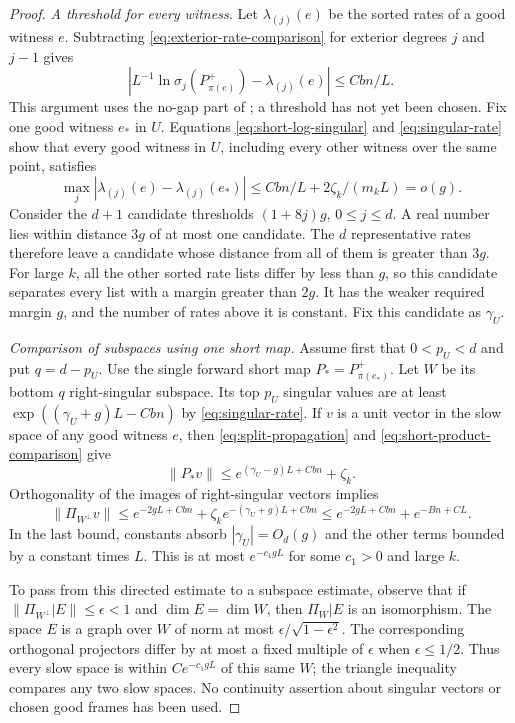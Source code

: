 \begin{proof}
\emph{A threshold for every witness.}
Let $\lambda_{(j)}(e)$ be the sorted rates of a good witness $e$.
Subtracting \eqref{eq:exterior-rate-comparison} for exterior degrees
$j$ and $j-1$ gives
\begin{equation}\label{eq:singular-rate}
 \left|L^{-1}\ln\sigma_j(P_{\pi(e)}^+)
                     -\lambda_{(j)}(e)\right|
       \leq Cbn/L.
\end{equation}
This argument uses the no-gap part of
; a threshold has not yet been chosen.
Fix one good witness $e_*$ in $U$.
Equations \eqref{eq:short-log-singular} and \eqref{eq:singular-rate}
show that every good witness in $U$, including every other witness
over the same point, satisfies
\[
 \max_j|\lambda_{(j)}(e)-\lambda_{(j)}(e_*)|
 \leq Cbn/L+2\zeta_k/(m_kL)=o(g).
\]
Consider the $d+1$ candidate thresholds $(1+8j)g$, $0\leq j\leq d$.
A real number lies within distance $3g$ of at most one candidate.
The $d$ representative rates therefore leave a candidate whose
distance from all of them is greater than $3g$.
For large $k$, all the other sorted rate lists differ by less than
$g$, so this candidate separates every list with a margin greater
than $2g$.  It has the weaker required margin $g$, and the number of
rates above it is constant.  Fix this candidate as $\gamma_U$.

\emph{Comparison of subspaces using one short map.}
Assume first that $0<p_U<d$ and put $q=d-p_U$.
Use the single forward short map $P_*=P_{\pi(e_*)}^+$.
Let $W$ be its bottom $q$ right-singular subspace.
Its top $p_U$ singular values are at least
$\exp((\gamma_U+g)L-Cbn)$ by \eqref{eq:singular-rate}.
If $v$ is a unit vector in the slow space of any good witness $e$,
then \eqref{eq:split-propagation} and
\eqref{eq:short-product-comparison} give
\[
 \|P_*v\|\leq e^{(\gamma_U-g)L+Cbn}+\zeta_k.
\]
Orthogonality of the images of right-singular vectors implies
\[
 \|\Pi_{W^\perp}v\|
 \leq e^{-2gL+Cbn}
       +\zeta_k e^{-(\gamma_U+g)L+Cbn}
 \leq e^{-2gL+Cbn}+e^{-Bn+CL}.
\]
In the last bound, constants absorb
$|\gamma_U|=O_d(g)$ and the other terms bounded by a constant times
$L$.  This is at most $e^{-c_1gL}$ for some $c_1>0$ and large $k$.

To pass from this directed estimate to a subspace estimate, observe
that if $\|\Pi_{W^\perp}|E\|\leq\epsilon<1$ and
$\dim E=\dim W$, then $\Pi_W|E$ is an isomorphism.
The space $E$ is a graph over $W$ of norm at most
$\epsilon/\sqrt{1-\epsilon^2}$.
The corresponding orthogonal projectors differ by at most a fixed
multiple of $\epsilon$ when $\epsilon\leq1/2$.
Thus every slow space is within $C e^{-c_1gL}$ of this same $W$;
the triangle inequality compares any two slow spaces.
No continuity assertion about singular vectors or chosen good frames
has been used.


\end{proof}
